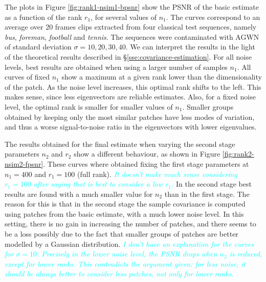 \documentclass[10pt, journal, twocolumn, final, a4paper]{IEEEtran}
\newcommand{\pa}[1]{\textcolor{cyan}{#1}}
\newcommand{\pcomment}[1]{\textit{\pa{#1}}}
\begin{document}
The plots in Figure \ref{fig:rank1-nsim1-bpsnr} show the PSNR of the basic
estimate as a function of the rank $r_1$, for several values of $n_{1}$.
The curves correspond to an average over 20 frames clips 
extracted from four classical test
sequences, namely \emph{bus}, \emph{foreman}, \emph{football} and \emph{tennis}.
The sequences were contaminated with AGWN of standard deviation $\sigma = 10,
20, 30, 40$. 
%
%
We can interpret the results in the light of the theoretical results
described in \S \ref{sse:covariance-estimation}.
For all noise levels, best results are obtained when using a larger number of
samples $n_1$. All curves of fixed $n_1$ show a maximum at a given rank lower than
the dimensionality of the patch. As the noise level increases, this optimal rank
shifts to the left. This makes sense, since less eigenvectors are reliable estimates.
%
Also, for a fixed noise level, the optimal rank is smaller for smaller values of $n_1$.
Smaller groups obtained by keeping only the
most similar patches have less modes of variation, and thus a worse signal-to-noise ratio
in the eigenvectors with lower eigenvalues.

The results obtained for the final estimate when varying the second stage
parameters $n_2$ and $r_2$ show a different behaviour, as shown in Figure
\ref{fig:rank2-nsim2-fpsnr}.
These curves where obtained fixing the first stage parameters at $n_1 = 400$
and $r_1 = 100$ (full rank).
\pcomment{It doesn't make much sense considering $r_1 = 100$ after saying that
is best to consider a low $r_1$.}
%
In the second stage best results are found with a much smaller value
for $n_{2}$ than in the first stage.
%
The reason for this is that in the second stage the sample covariance is computed
using patches from the basic estimate, with a much lower noise level.
In this setting, there is no gain in increasing the number of patches,
and there seems to be a loss possibly due to the fact that smaller groups of patches
are better modelled by a Gaussian distribution.
\pcomment{I don't have an explanation for the curves for $\sigma = 10$. Precisely
in the lower noise level, the PSNR drops when $n_2$ is reduced, except for lower ranks.
This contradicts the argument given: for less noise, it should be always better to consider
less patches, not only for lower ranks.} 
\end{document}
